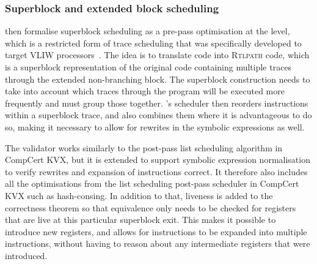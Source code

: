 \subsubsection{Superblock and extended block scheduling}

\textcite{six22_formal_verif_super_sched} then formalise superblock scheduling
as a pre-pass optimisation at the \rtl{} level, which is a restricted form of
trace scheduling that was specifically developed to target VLIW
processors~\cite[]{hwu93_super}.  The idea is to translate \rtl{} code into
\textsc{Rtlpath} code, which is a superblock representation of the original code
containing multiple traces through the extended non-branching block.  The
superblock construction needs to take into account which traces through the
program will be executed more frequently and must group those together.
\citeauthor{six22_formal_verif_super_sched}'s scheduler then reorders
instructions within a superblock trace, and also combines them where it is
advantageous to do so, making it necessary to allow for rewrites in the symbolic
expressions as well.

The validator works similarly to the post-pass list scheduling algorithm in
CompCert KVX, but it is extended to support symbolic expression normalisation to
verify rewrites and expansion of instructions correct.  It therefore also
includes all the optimisations from the list scheduling post-pass scheduler in
CompCert KVX such as hash-consing.  In addition to that, liveness is added to
the correctness theorem so that equivalence only needs to be checked for
registers that are live at this particular superblock exit.  This makes it
possible to introduce new registers, and allows for instructions to be expanded
into multiple instructions, without having to reason about any intermediate
registers that were introduced.

